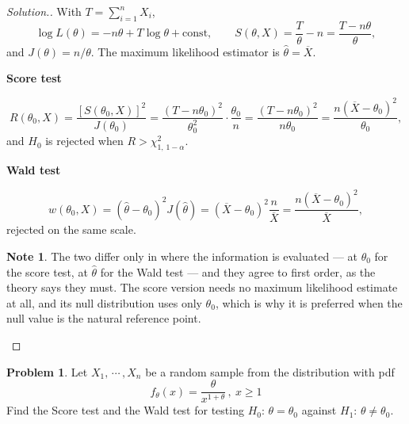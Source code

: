\documentclass[12pt,a4paper]{report}
\theoremstyle{definition}
\newtheorem*{note}{Note}
\newcommand{\subhead}[1]{%
  \par\medskip\noindent\textbf{#1}\par\nobreak\smallskip}
\newtheorem{problemx}{Problem}[section]
\newenvironment{problem}{\begin{problemx}}{\end{problemx}}
\newenvironment{solution}
  {\renewcommand{\qedsymbol}{}\begin{proof}[\textit{Solution}.]}
  {\end{proof}}
\begin{document}
\begin{solution}
With $T=\sum_{i=1}^{n}X_i$,
\[\log L(\theta) = -n\theta + T\log\theta + \text{const},\qquad
S(\theta,X) = \frac{T}{\theta} - n = \frac{T-n\theta}{\theta},\]
and $J(\theta) = n/\theta$. The maximum likelihood estimator is
$\widehat{\theta}=\overline{X}$.

\subhead{Score test}
\[R(\theta_0,X) = \frac{\left[S(\theta_0,X)\right]^{2}}{J(\theta_0)}
= \frac{(T-n\theta_0)^{2}}{\theta_0^{2}}\cdot\frac{\theta_0}{n}
= \frac{(T-n\theta_0)^{2}}{n\theta_0}
= \frac{n\left(\overline{X}-\theta_0\right)^{2}}{\theta_0},\]
and $H_0$ is rejected when $R>\chi^{2}_{1,\,1-\alpha}$.

\subhead{Wald test}
\[w(\theta_0,X) = \left(\widehat{\theta}-\theta_0\right)^{2}J\left(\widehat{\theta}\right)
= \left(\overline{X}-\theta_0\right)^{2}\frac{n}{\overline{X}}
= \frac{n\left(\overline{X}-\theta_0\right)^{2}}{\overline{X}},\]
rejected on the same scale.

\begin{note}
The two differ only in where the information is evaluated --- at $\theta_0$ for
the score test, at $\widehat{\theta}$ for the Wald test --- and they agree to
first order, as the theory says they must. The score version needs no maximum
likelihood estimate at all, and its null distribution uses only $\theta_0$,
which is why it is preferred when the null value is the natural reference point.
\end{note}
\end{solution}

\begin{problem}
Let $X_1, \, \cdots\, , X_n$ be a random sample from the distribution with pdf \[f_{\theta}(x) = \frac{\theta}{x^{1 + \theta}}\, , \  x\geq 1\]
Find the Score test and the Wald test for testing $H_0:\, \theta = \theta_0$ against $H_1:\, \theta \neq \theta_0.$
\end{problem}
\end{document}
